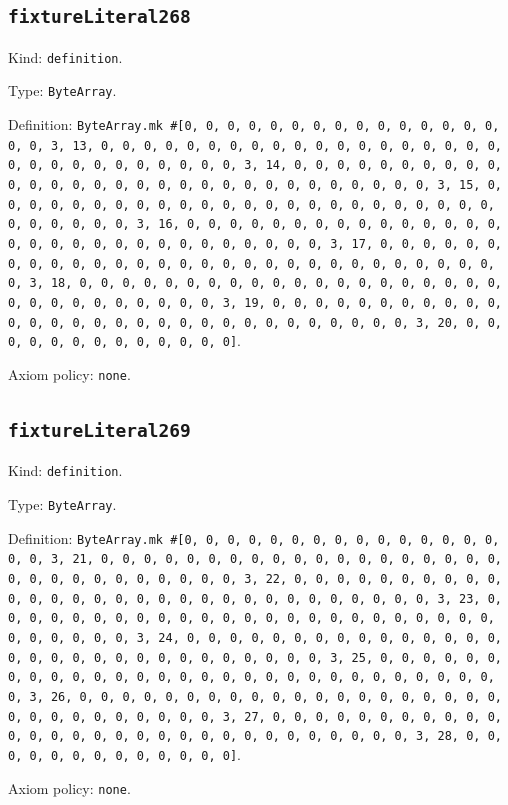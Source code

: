\documentclass[11pt]{article}
\begin{document}
\subsection*{\texttt{fixtureLiteral268}}
\noindent Kind: \texttt{definition}.\par
\noindent Type: \texttt{ByteArray}.\par
\noindent Definition: \texttt{ByteArray.mk \#[0, 0, 0, 0, 0, 0, 0, 0, 0, 0, 0, 0, 0, 0, 0, 0, 0, 3, 13, 0, 0, 0, 0, 0, 0, 0, 0, 0, 0, 0, 0, 0, 0, 0, 0, 0, 0, 0, 0, 0, 0, 0, 0, 0, 0, 0, 0, 0, 0, 3, 14, 0, 0, 0, 0, 0, 0, 0, 0, 0, 0, 0, 0, 0, 0, 0, 0, 0, 0, 0, 0, 0, 0, 0, 0, 0, 0, 0, 0, 0, 0, 3, 15, 0, 0, 0, 0, 0, 0, 0, 0, 0, 0, 0, 0, 0, 0, 0, 0, 0, 0, 0, 0, 0, 0, 0, 0, 0, 0, 0, 0, 0, 0, 3, 16, 0, 0, 0, 0, 0, 0, 0, 0, 0, 0, 0, 0, 0, 0, 0, 0, 0, 0, 0, 0, 0, 0, 0, 0, 0, 0, 0, 0, 0, 0, 3, 17, 0, 0, 0, 0, 0, 0, 0, 0, 0, 0, 0, 0, 0, 0, 0, 0, 0, 0, 0, 0, 0, 0, 0, 0, 0, 0, 0, 0, 0, 0, 3, 18, 0, 0, 0, 0, 0, 0, 0, 0, 0, 0, 0, 0, 0, 0, 0, 0, 0, 0, 0, 0, 0, 0, 0, 0, 0, 0, 0, 0, 0, 0, 3, 19, 0, 0, 0, 0, 0, 0, 0, 0, 0, 0, 0, 0, 0, 0, 0, 0, 0, 0, 0, 0, 0, 0, 0, 0, 0, 0, 0, 0, 0, 0, 3, 20, 0, 0, 0, 0, 0, 0, 0, 0, 0, 0, 0, 0, 0]}.\par
\noindent Axiom policy: \texttt{none}.\par
\subsection*{\texttt{fixtureLiteral269}}
\noindent Kind: \texttt{definition}.\par
\noindent Type: \texttt{ByteArray}.\par
\noindent Definition: \texttt{ByteArray.mk \#[0, 0, 0, 0, 0, 0, 0, 0, 0, 0, 0, 0, 0, 0, 0, 0, 0, 3, 21, 0, 0, 0, 0, 0, 0, 0, 0, 0, 0, 0, 0, 0, 0, 0, 0, 0, 0, 0, 0, 0, 0, 0, 0, 0, 0, 0, 0, 0, 0, 3, 22, 0, 0, 0, 0, 0, 0, 0, 0, 0, 0, 0, 0, 0, 0, 0, 0, 0, 0, 0, 0, 0, 0, 0, 0, 0, 0, 0, 0, 0, 0, 3, 23, 0, 0, 0, 0, 0, 0, 0, 0, 0, 0, 0, 0, 0, 0, 0, 0, 0, 0, 0, 0, 0, 0, 0, 0, 0, 0, 0, 0, 0, 0, 3, 24, 0, 0, 0, 0, 0, 0, 0, 0, 0, 0, 0, 0, 0, 0, 0, 0, 0, 0, 0, 0, 0, 0, 0, 0, 0, 0, 0, 0, 0, 0, 3, 25, 0, 0, 0, 0, 0, 0, 0, 0, 0, 0, 0, 0, 0, 0, 0, 0, 0, 0, 0, 0, 0, 0, 0, 0, 0, 0, 0, 0, 0, 0, 3, 26, 0, 0, 0, 0, 0, 0, 0, 0, 0, 0, 0, 0, 0, 0, 0, 0, 0, 0, 0, 0, 0, 0, 0, 0, 0, 0, 0, 0, 0, 0, 3, 27, 0, 0, 0, 0, 0, 0, 0, 0, 0, 0, 0, 0, 0, 0, 0, 0, 0, 0, 0, 0, 0, 0, 0, 0, 0, 0, 0, 0, 0, 0, 3, 28, 0, 0, 0, 0, 0, 0, 0, 0, 0, 0, 0, 0, 0]}.\par
\noindent Axiom policy: \texttt{none}.\par
\end{document}
